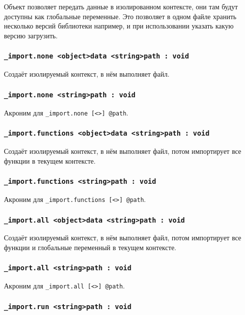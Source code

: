 \documentclass[a4paper, 14pt]{extarticle}
\begin{document}
Объект  позволяет передать данные в изолированном контексте, они там будут доступны как глобальные переменные. Это позволяет в одном файле хранить несколько версий библиотеки например, и при использовании указать какую версию загрузить.

\subsubsection{\lstinline|_import.none <object>data <string>path : void|}

Создаёт изолируемый контекст, в нём выполняет файл.

\subsubsection{\lstinline|_import.none <string>path : void|}

Акроним для \lstinline|_import.none [<>] @path|.

\subsubsection{\lstinline|_import.functions <object>data <string>path : void|}

Создаёт изолируемый контекст, в нём выполняет файл, потом импортирует все функции в текущем контексте.

\subsubsection{\lstinline|_import.functions <string>path : void|}

Акроним для \lstinline|_import.functions [<>] @path|.

\subsubsection{\lstinline|_import.all <object>data <string>path : void|}

Создаёт изолируемый контекст, в нём выполняет файл, потом импортирует все функции и глобальные переменный в текущем контексте.

\subsubsection{\lstinline|_import.all <string>path : void|}

Акроним для \lstinline|_import.all [<>] @path|.

\subsubsection{\lstinline|_import.run <string>path : void|}
\end{document}
